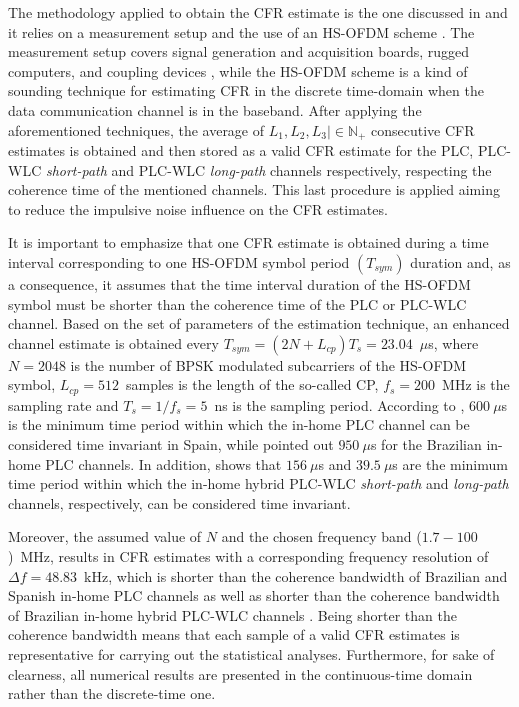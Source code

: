 \documentclass[journal]{IEEEtran}
\begin{document}
The methodology applied to obtain the \ac{CFR} estimate is the one discussed in \cite{Thiago:FR} and it relies on a measurement setup and the use of an \ac{HS-OFDM} scheme \cite{HSOFDM,Picorone}. The measurement setup covers signal generation and acquisition boards, rugged computers, and coupling devices \cite{Luis:AI}, while the \ac{HS-OFDM} scheme is a kind of sounding technique for estimating \ac{CFR} in the discrete time-domain when the data communication channel is in the baseband. After applying the aforementioned techniques, the average of $L_1, L_2, L_3 | \in \mathbb{N}_+$ consecutive \ac{CFR} estimates is obtained and then stored as a valid \ac{CFR} estimate for the \ac{PLC}, \ac{PLC}-\ac{WLC} \textit{short-path} and \ac{PLC}-\ac{WLC} \textit{long-path} channels respectively, respecting the coherence time of the mentioned channels. This last procedure is applied aiming to reduce the impulsive noise influence on the \ac{CFR} estimates.

It is important to emphasize that one \ac{CFR} estimate is obtained during a time interval corresponding to one \ac{HS-OFDM} symbol period $(T_{sym})$ duration and, as a consequence, it assumes that the time interval duration of the \ac{HS-OFDM} symbol must be shorter than the coherence time of the \ac{PLC} or \ac{PLC}-\ac{WLC} channel. Based on the set of parameters of the estimation technique, an enhanced channel estimate is obtained every $T_{sym}=(2N + L_{cp}) T_s = 23.04$~$\mu$s, where $N=2048$ is the number of \ac{BPSK} modulated subcarriers of the \ac{HS-OFDM} symbol, $L_{cp}=512$~samples is the length of the so-called \ac{CP}, $f_s=200$~MHz is the sampling rate and $T_s=1/f_s=5$~ns is the sampling period. According to \cite{Canete:AIPLC}, $600~\mu$s is the minimum time period within which the in-home \ac{PLC} channel can be considered time invariant in Spain, while \cite{Thiago:Characterization} pointed out $950~\mu$s for the Brazilian in-home \ac{PLC} channels. In addition, \cite{thiago:hyb} shows that  $156~\mu$s and $39.5~\mu$s are the minimum time period within which the in-home hybrid \ac{PLC}-\ac{WLC} \textit{short-path} and \textit{long-path} channels, respectively, can be considered time invariant.

Moreover, the assumed value of $N$ and the chosen frequency band ($1.7-100$)~MHz, results in \ac{CFR} estimates with a corresponding frequency resolution of $\Delta f=48.83$~kHz, which is shorter than the coherence bandwidth of Brazilian and Spanish in-home PLC channels \cite{Canete:AIPLC,Thiago:Characterization} as well as shorter than the coherence bandwidth of Brazilian in-home hybrid \ac{PLC}-\ac{WLC} channels \cite{thiago:hyb}. Being shorter than the coherence bandwidth means that each sample of a valid \ac{CFR} estimates is representative for carrying out the statistical analyses. Furthermore, for sake of clearness, all numerical results are presented in the continuous-time domain rather than the discrete-time one.
\end{document}
